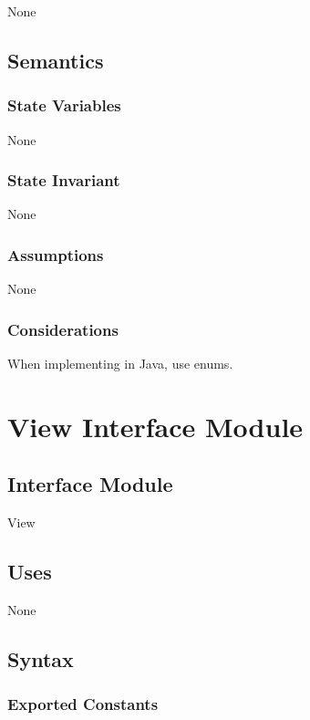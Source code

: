 \documentclass[12pt]{article}
\begin{document}
None

\subsection* {Semantics}

\subsubsection* {State Variables}

None

\subsubsection* {State Invariant}

None

\subsubsection* {Assumptions}

None

\subsubsection* {Considerations}

When implementing in Java, use enums.

\newpage

\section* {View Interface Module}

\subsection*{Interface Module}

View

\subsection* {Uses}

None

\subsection* {Syntax}

\subsubsection* {Exported Constants}
\end{document}
